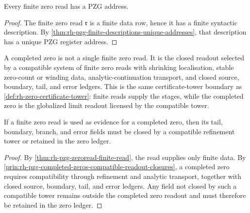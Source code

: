 \begin{corollary}
\label{cor:rh-pzg-zero-reads-have-pzg-addresses}
Every finite zero read has a PZG address.
\end{corollary}

\begin{proof}
The finite zero read $\mathfrak r$ is a finite data row, hence it has a
finite syntactic description.  By
\autoref{thm:rh-pzg-finite-descriptions-unique-addresses}, that description
has a unique PZG register address.
\end{proof}

\begin{principle}
\label{prin:rh-pzg-completed-zeros-compatible-readout-closures}
A completed zero is not a single finite zero read.  It is the closed readout
selected by a compatible system of finite zero reads with shrinking
localisation, stable zero-count or winding data, analytic-continuation
transport, and closed source, boundary, tail, and error ledgers.  This is the
same certificate-tower boundary as
\autoref{def:rh-zero-certificate-tower}: finite reads supply the stages, while
the completed zero is the globalized limit readout licensed by the compatible
tower.
\end{principle}

\begin{theorem}
\label{thm:rh-pzg-finite-zero-reads-create-zero-ledger-obligations}
If a finite zero read is used as evidence for a completed zero, then its tail,
boundary, branch, and error fields must be closed by a compatible refinement
tower or retained in the zero ledger.
\end{theorem}

\begin{proof}
By \autoref{thm:rh-pzg-zeroread-finite-read}, the read supplies only finite
data.  By
\autoref{prin:rh-pzg-completed-zeros-compatible-readout-closures}, a
completed zero requires compatibility through refinement and analytic
transport, together with closed source, boundary, tail, and error ledgers.
Any field not closed by such a compatible tower remains outside the completed
zero readout and must therefore be retained in the zero ledger.
\end{proof}
